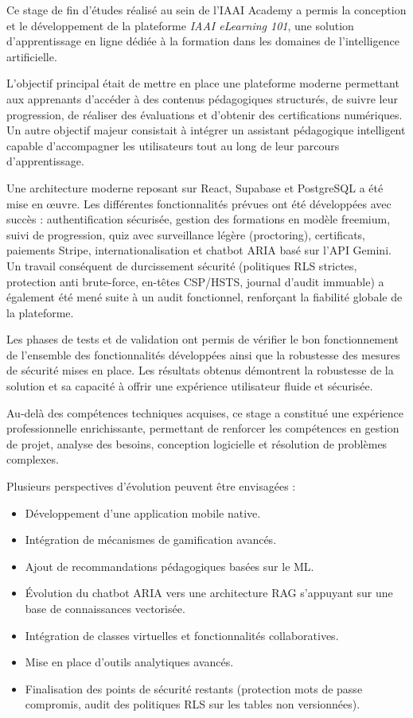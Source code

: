 \documentclass[12pt, a4paper]{report}
\begin{document}
Ce stage de fin d'études réalisé au sein de l'IAAI Academy a permis la conception et le développement de la plateforme \textit{IAAI eLearning 101}, une solution d'apprentissage en ligne dédiée à la formation dans les domaines de l'intelligence artificielle.

L'objectif principal était de mettre en place une plateforme moderne permettant aux apprenants d'accéder à des contenus pédagogiques structurés, de suivre leur progression, de réaliser des évaluations et d'obtenir des certifications numériques. Un autre objectif majeur consistait à intégrer un assistant pédagogique intelligent capable d'accompagner les utilisateurs tout au long de leur parcours d'apprentissage.

Une architecture moderne reposant sur React, Supabase et PostgreSQL a été mise en œuvre. Les différentes fonctionnalités prévues ont été développées avec succès : authentification sécurisée, gestion des formations en modèle freemium, suivi de progression, quiz avec surveillance légère (proctoring), certificats, paiements Stripe, internationalisation et chatbot ARIA basé sur l'API Gemini. Un travail conséquent de durcissement sécurité (politiques RLS strictes, protection anti brute-force, en-têtes CSP/HSTS, journal d'audit immuable) a également été mené suite à un audit fonctionnel, renforçant la fiabilité globale de la plateforme.

Les phases de tests et de validation ont permis de vérifier le bon fonctionnement de l'ensemble des fonctionnalités développées ainsi que la robustesse des mesures de sécurité mises en place. Les résultats obtenus démontrent la robustesse de la solution et sa capacité à offrir une expérience utilisateur fluide et sécurisée.

Au-delà des compétences techniques acquises, ce stage a constitué une expérience professionnelle enrichissante, permettant de renforcer les compétences en gestion de projet, analyse des besoins, conception logicielle et résolution de problèmes complexes.

Plusieurs perspectives d'évolution peuvent être envisagées :
\begin{itemize}
    \item Développement d'une application mobile native.
    \item Intégration de mécanismes de gamification avancés.
    \item Ajout de recommandations pédagogiques basées sur le ML.
    \item Évolution du chatbot ARIA vers une architecture RAG s'appuyant sur une base de connaissances vectorisée.
    \item Intégration de classes virtuelles et fonctionnalités collaboratives.
    \item Mise en place d'outils analytiques avancés.
    \item Finalisation des points de sécurité restants (protection mots de passe compromis, audit des politiques RLS sur les tables non versionnées).
\end{itemize}
\end{document}

